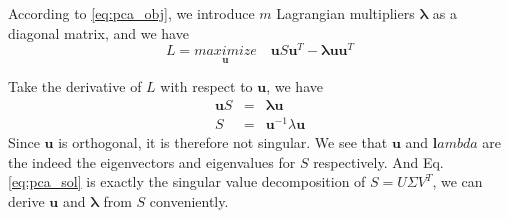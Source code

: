 \documentclass{article}
\newcommand{\vct}[1]{\ensuremath{\boldsymbol{#1}}} %
\begin{document}
According to \eqref{eq:pca_obj}, we introduce $m$ Lagrangian multipliers $\vct \lambda$ as a diagonal matrix, and we have 
\[ L = \underset{\vct u}{\textit{maximize}}\quad \vct u S \vct u^T - \vct\lambda \vct u\vct u^T \]

Take the derivative of $L$ with respect to $\vct u$, we have
\begin{eqnarray}
	\vct uS & = & \vct\lambda\vct u \nonumber \\
	S & = & \vct u^{-1}\lambda\vct u
	\label{eq:pca_sol}
\end{eqnarray}
Since $\vct u$ is orthogonal, it is therefore not singular. We see that $\vct u$ and $\vct lambda$ are the indeed the eigenvectors and eigenvalues for $S$ respectively. And Eq.\eqref{eq:pca_sol} is exactly the singular value decomposition of $S=U\Sigma V^T$, we can derive $\vct u$ and $ \vct{\lambda} $ from $S$ conveniently. 



\end{document}
